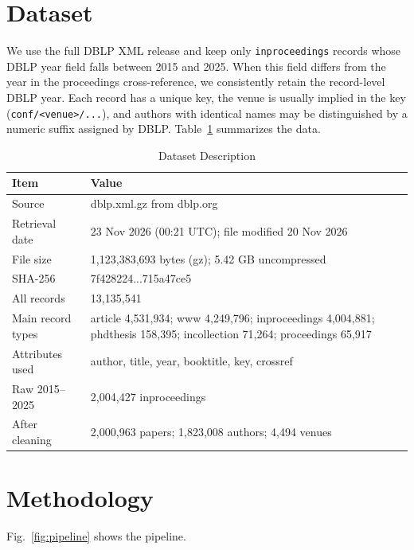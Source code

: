 ﻿\documentclass[conference]{IEEEtran}
\begin{document}
\section{Dataset}
We use the full DBLP XML release \cite{dblp} and keep only \texttt{inproceedings} records whose DBLP year field falls between 2015 and 2025. When this field differs from the year in the proceedings cross-reference, we consistently retain the record-level DBLP year. Each record has a unique key, the venue is usually implied in the key (\texttt{conf/<venue>/...}), and authors with identical names may be distinguished by a numeric suffix assigned by DBLP. Table~\ref{tab:dataset} summarizes the data.

\begin{table}[t]
\caption{Dataset Description}
\label{tab:dataset}
\centering
\footnotesize
\begin{tabular}{p{2.3cm}p{5.1cm}}
\toprule
Item & Value \\
\midrule
Source & dblp.xml.gz from dblp.org \cite{dblp} \\
Retrieval date & 23 Nov 2026 (00:21 UTC); file modified 20 Nov 2026 \\
File size & 1,123,383,693 bytes (gz); 5.42 GB uncompressed \\
SHA-256 & 7f428224...715a47ce5 \\
All records & 13,135,541 \\
Main record types & article 4,531,934; www 4,249,796; inproceedings 4,004,881; phdthesis 158,395; incollection 71,264; proceedings 65,917 \\
Attributes used & author, title, year, booktitle, key, crossref \\
Raw 2015--2025 & 2,004,427 inproceedings \\
After cleaning & 2,000,963 papers; 1,823,008 authors; 4,494 venues \\
\bottomrule
\end{tabular}
\end{table}

\section{Methodology}
Fig.~\ref{fig:pipeline} shows the pipeline.
\end{document}
